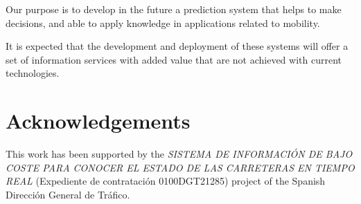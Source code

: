 \documentclass{llncs}
\begin{document}
Our purpose is to develop in the future a prediction system that helps to make decisions, and able to apply knowledge in applications related to mobility.


It is expected that the development and deployment of these systems will offer a set of information services with added value that are not achieved with current technologies.


\bigskip

\section*{Acknowledgements}

This work has been supported by the \emph{SISTEMA DE INFORMACIÓN DE BAJO COSTE PARA CONOCER EL ESTADO DE LAS CARRETERAS EN TIEMPO REAL}
(Expediente de contratación 0100DGT21285) 
project of the Spanish Dirección General de Tráfico.
 







\end{document}
